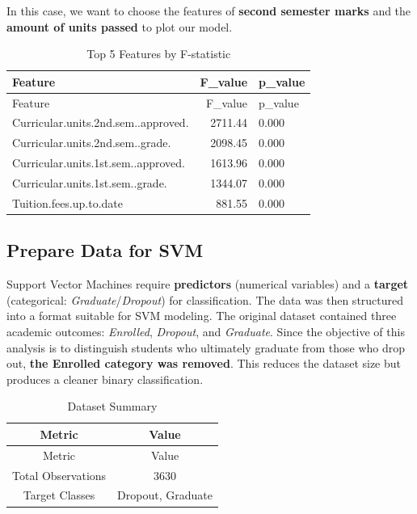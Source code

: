 \documentclass[
]{article}
\begin{document}
In this case, we want to choose the features of \textbf{second semester
marks} and the \textbf{amount of units passed} to plot our model.

\begin{longtable}[]{@{}lrl@{}}
\caption{Top 5 Features by F-statistic}\tabularnewline
\toprule\noalign{}
Feature & F\_value & p\_value \\
\midrule\noalign{}
\endfirsthead
\toprule\noalign{}
Feature & F\_value & p\_value \\
\midrule\noalign{}
\endhead
\bottomrule\noalign{}
\endlastfoot
Curricular.units.2nd.sem..approved. & 2711.44 & 0.000 \\
Curricular.units.2nd.sem..grade. & 2098.45 & 0.000 \\
Curricular.units.1st.sem..approved. & 1613.96 & 0.000 \\
Curricular.units.1st.sem..grade. & 1344.07 & 0.000 \\
Tuition.fees.up.to.date & 881.55 & 0.000 \\
\end{longtable}

\subsection{Prepare Data for SVM}\label{prepare-data-for-svm}

Support Vector Machines require \textbf{predictors} (numerical
variables) and a \textbf{target} (categorical:
\emph{Graduate}/\emph{Dropout}) for classification. The data was then
structured into a format suitable for SVM modeling. The original dataset
contained three academic outcomes: \emph{Enrolled}, \emph{Dropout}, and
\emph{Graduate}. Since the objective of this analysis is to distinguish
students who ultimately graduate from those who drop out, \textbf{the
Enrolled category was removed}. This reduces the dataset size but
produces a cleaner binary classification.

\begin{longtable}[]{@{}cc@{}}
\caption{Dataset Summary}\tabularnewline
\toprule\noalign{}
Metric & Value \\
\midrule\noalign{}
\endfirsthead
\toprule\noalign{}
Metric & Value \\
\midrule\noalign{}
\endhead
\bottomrule\noalign{}
\endlastfoot
Total Observations & 3630 \\
Target Classes & Dropout, Graduate \\
\end{longtable}
\end{document}

